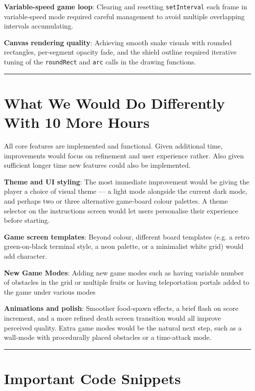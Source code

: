 \documentclass[12pt,a4paper]{article}
\newcommand{\sectionsep}{
    \vspace{1.5em}
    \noindent\rule{\textwidth}{0.8pt}
    \vspace{1.5em}
}
\begin{document}
\textbf{Variable-speed game loop}: Clearing and resetting \texttt{setInterval} each frame in variable-speed mode required careful management to avoid multiple overlapping intervals accumulating.

\textbf{Canvas rendering quality}: Achieving smooth snake visuals with rounded rectangles, per-segment opacity fade, and the shield outline required iterative tuning of the \texttt{roundRect} and \texttt{arc} calls in the drawing functions.

\sectionsep

\section{What We Would Do Differently With 10 More Hours}

All core features are implemented and functional. Given additional time, improvements would focus on refinement and user experience rather.
Also given sufficient longer time new features could also be implemented.

\textbf{Theme and UI styling}: The most immediate improvement would be giving the player a choice of visual theme --- a light mode alongside the current dark mode, and perhaps two or three alternative game-board colour palettes. A theme selector on the instructions screen would let users personalise their experience before starting.

\textbf{Game screen templates}: Beyond colour, different board templates (e.g. a retro green-on-black terminal style, a neon palette, or a minimalist white grid) would add character.

\textbf{New Game Modes}: Adding new game modes such as having variable number of obstacles in the grid or multiple fruits or having teleportation portals added to the game under various modes

\textbf{Animations and polish}: Smoother food-spawn effects, a brief flash on score increment, and a more refined death screen transition would all improve perceived quality. Extra game modes would be the natural next step, such as a wall-mode with procedurally placed obstacles or a time-attack mode.

\sectionsep

\section{Important Code Snippets}
\end{document}
